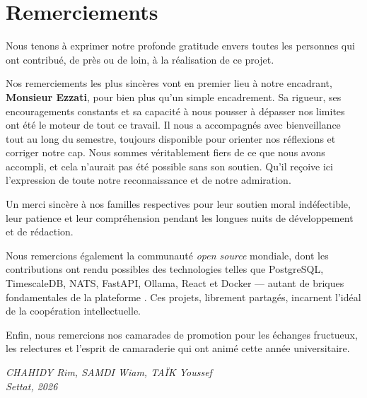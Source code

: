 \chapter*{Remerciements}

\vspace{0.5cm}

Nous tenons à exprimer notre profonde gratitude envers toutes les personnes
qui ont contribué, de près ou de loin, à la réalisation de ce projet.

Nos remerciements les plus sincères vont en premier lieu à notre encadrant,
\textbf{Monsieur Ezzati}, pour bien plus qu'un simple encadrement. Sa rigueur,
ses encouragements constants et sa capacité à nous pousser à dépasser nos
limites ont été le moteur de tout ce travail. Il nous a accompagnés avec
bienveillance tout au long du semestre, toujours disponible pour orienter
nos réflexions et corriger notre cap. Nous sommes véritablement fiers de ce
que nous avons accompli, et cela n'aurait pas été possible sans son soutien.
Qu'il reçoive ici l'expression de toute notre reconnaissance et de notre
admiration.

Un merci sincère à nos familles respectives pour leur soutien moral
indéfectible, leur patience et leur compréhension pendant les longues
nuits de développement et de rédaction.

Nous remercions également la communauté \textit{open source} mondiale,
dont les contributions ont rendu possibles des technologies telles que
PostgreSQL, TimescaleDB, NATS, FastAPI, Ollama, React et Docker — autant
de briques fondamentales de la plateforme \caimp{}. Ces projets, librement
partagés, incarnent l'idéal de la coopération intellectuelle.

Enfin, nous remercions nos camarades de promotion pour les échanges
fructueux, les relectures et l'esprit de camaraderie qui ont animé cette
année universitaire.

\bigskip
\begin{flushright}
\textit{CHAHIDY Rim, SAMDI Wiam, TAÏK Youssef}\\
\textit{Settat, 2026}
\end{flushright}
